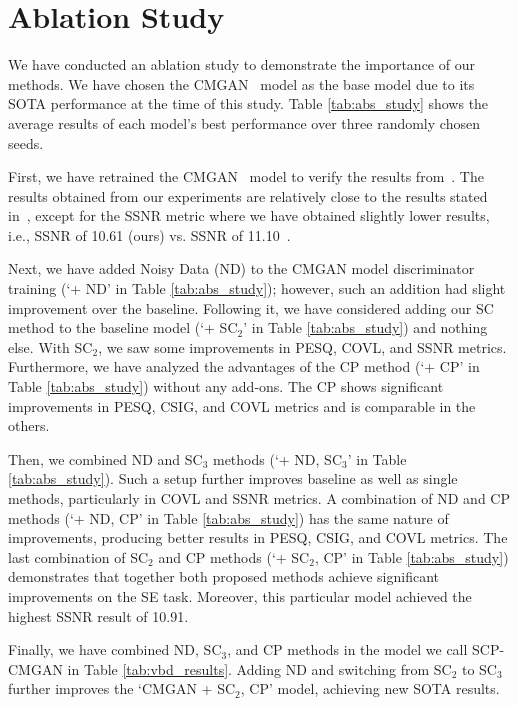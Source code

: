 \documentclass{article}
\begin{document}
\section{Ablation Study}\label{sec:ablstudy}

We have conducted an ablation study to demonstrate the importance of our methods. We have chosen the CMGAN~\cite{cao2022cmgan} model as the base model due to its SOTA performance at the time of this study. Table \ref{tab:abs_study} shows the average results of each model's best performance over three randomly chosen seeds.

First, we have retrained the CMGAN~\cite{cao2022cmgan} model to verify the results from~\cite{cao2022cmgan}. The results obtained from our experiments are relatively close to the results stated in~\cite{cao2022cmgan}, except for the SSNR metric where we have obtained slightly lower results, i.e., SSNR of 10.61 (ours) vs. SSNR of 11.10~\cite{cao2022cmgan}.

Next, we have added Noisy Data (ND) to the CMGAN model discriminator training (`+ ND' in Table \ref{tab:abs_study}); however, such an addition had slight improvement over the baseline. Following it, we have considered adding our SC method 
to the baseline model (`+ SC$_{2}$' in Table \ref{tab:abs_study}) and nothing else. 
With SC$_{2}$, we saw some improvements in PESQ, COVL, and SSNR metrics. Furthermore, we have analyzed the advantages of the CP method (`+ CP' in Table \ref{tab:abs_study}) without any add-ons. The CP shows significant improvements in PESQ, CSIG, and COVL metrics and is comparable in the others.

Then, we combined ND and SC$_3$ methods (`+ ND, SC$_3$' in Table \ref{tab:abs_study}).
Such a setup further improves baseline as well as single methods, particularly in COVL and SSNR metrics. A combination of ND and CP methods (`+ ND, CP' in Table \ref{tab:abs_study}) has the same nature of improvements, producing better results in PESQ, CSIG, and COVL metrics. The last combination of SC$_2$ and CP methods (`+ SC$_2$, CP' in Table \ref{tab:abs_study}) demonstrates that together both proposed methods achieve significant improvements on the SE task. Moreover, this particular model achieved the highest SSNR result of 10.91.

Finally, we have combined ND, SC$_3$, and CP methods in the model we call SCP-CMGAN in Table \ref{tab:vbd_results}. Adding ND and switching from SC$_2$ to SC$_3$ further improves the `CMGAN + SC$_2$, CP' model, achieving new SOTA results.
\end{document}
